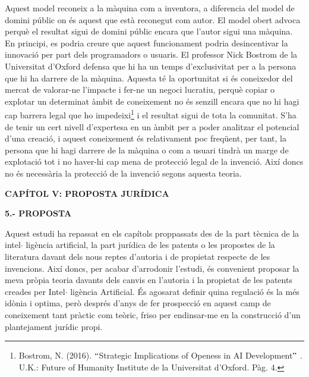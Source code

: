 \documentclass[12pt]{article}
\begin{document}
\vspace{\baselineskip}
\begin{justify}
Aquest model reconeix a la màquina com a inventora, a diferencia del model de domini públic on és aquest que està reconegut com autor.  El model obert advoca perquè el resultat sigui de domini públic encara que l’autor sigui una màquina. En principi, es podria creure que aquest funcionament podria desincentivar la innovació per part dels programadors o usuaris. El professor Nick Bostrom de la Universitat d’Oxford defensa que hi ha un temps d’exclusivitat per a la persona que hi ha darrere de la màquina. Aquesta té la oportunitat si és coneixedor del mercat de valorar-ne l’impacte i fer-ne un negoci lucratiu, perquè copiar o explotar un determinat àmbit de coneixement no és senzill encara que no hi hagi cap barrera legal que ho impedeixi\footnote{ Bostrom, N. (2016). $``$Strategic Implications of Openess in AI Development$"$ . U.K.: Future of Humanity Institute de la Universitat d’Oxford. Pàg. 4.  } i el resultat sigui de tota la comunitat. S’ha de tenir un cert nivell d’expertesa en un àmbit per a poder analitzar el potencial d’una creació, i aquest coneixement és relativament poc freqüent, per tant, la persona que hi hagi darrere de la màquina o com a usuari tindrà un marge de explotació tot i no haver-hi cap mena de protecció legal de la invenció. Així doncs no és necessària la protecció de la invenció segons aquesta teoria.
\end{justify}\par


\vspace{\baselineskip}
\begin{Center}
{\fontsize{16pt}{19.2pt}\selectfont \textbf{CAPÍTOL V: PROPOSTA JURÍDICA}\par}
\end{Center}\par


\vspace{\baselineskip}
\begin{justify}
\textbf{5.- PROPOSTA}
\end{justify}\par


\vspace{\baselineskip}
\begin{justify}
Aquest estudi ha repassat en els capítols proppassats des de la part tècnica de la intel$ \cdot $ ligència artificial, la part jurídica de les patents o les propostes de la literatura davant dels nous reptes d’autoria i de propietat respecte de les invencions. Així doncs, per acabar d’arrodonir l’estudi, és convenient proposar la meva pròpia teoria davants dels canvis en l’autoria i la propietat de les patents creades per Intel$ \cdot $ ligència Artificial. És agosarat definir quina regulació és la més idònia i optima, però després d’anys de fer prospecció en aquest camp de coneixement tant pràctic com teòric, friso per endinsar-me en la construcció d’un plantejament jurídic propi.
\end{justify}\par
\end{document}
